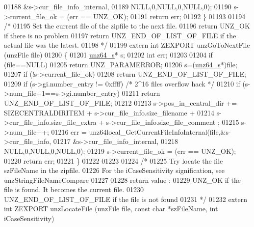 \begin{DoxyCode}
01188                                              &s->cur\_file\_info\_internal,
01189                                              NULL,0,NULL,0,NULL,0);
01190     s->current\_file\_ok = (err == UNZ\_OK);
01191     \textcolor{keywordflow}{return} err;
01192 \}
01193 
01194 \textcolor{comment}{/*}
01195 \textcolor{comment}{  Set the current file of the zipfile to the next file.}
01196 \textcolor{comment}{  return UNZ\_OK if there is no problem}
01197 \textcolor{comment}{  return UNZ\_END\_OF\_LIST\_OF\_FILE if the actual file was the latest.}
01198 \textcolor{comment}{*/}
01199 \textcolor{keyword}{extern} \textcolor{keywordtype}{int} ZEXPORT unzGoToNextFile (unzFile  file)
01200 \{
01201     \hyperlink{structunz64__s}{unz64\_s}* s;
01202     \textcolor{keywordtype}{int} err;
01203 
01204     \textcolor{keywordflow}{if} (file==NULL)
01205         \textcolor{keywordflow}{return} UNZ\_PARAMERROR;
01206     s=(\hyperlink{structunz64__s}{unz64\_s}*)file;
01207     \textcolor{keywordflow}{if} (!s->current\_file\_ok)
01208         \textcolor{keywordflow}{return} UNZ\_END\_OF\_LIST\_OF\_FILE;
01209     \textcolor{keywordflow}{if} (s->gi.number\_entry != 0xffff)    \textcolor{comment}{/* 2^16 files overflow hack */}
01210       \textcolor{keywordflow}{if} (s->num\_file+1==s->gi.number\_entry)
01211         \textcolor{keywordflow}{return} UNZ\_END\_OF\_LIST\_OF\_FILE;
01212 
01213     s->pos\_in\_central\_dir += SIZECENTRALDIRITEM + s->cur\_file\_info.size\_filename +
01214             s->cur\_file\_info.size\_file\_extra + s->cur\_file\_info.size\_file\_comment ;
01215     s->num\_file++;
01216     err = unz64local\_GetCurrentFileInfoInternal(file,&s->cur\_file\_info,
01217                                                &s->cur\_file\_info\_internal,
01218                                                NULL,0,NULL,0,NULL,0);
01219     s->current\_file\_ok = (err == UNZ\_OK);
01220     \textcolor{keywordflow}{return} err;
01221 \}
01222 
01223 
01224 \textcolor{comment}{/*}
01225 \textcolor{comment}{  Try locate the file szFileName in the zipfile.}
01226 \textcolor{comment}{  For the iCaseSensitivity signification, see unzStringFileNameCompare}
01227 \textcolor{comment}{}
01228 \textcolor{comment}{  return value :}
01229 \textcolor{comment}{  UNZ\_OK if the file is found. It becomes the current file.}
01230 \textcolor{comment}{  UNZ\_END\_OF\_LIST\_OF\_FILE if the file is not found}
01231 \textcolor{comment}{*/}
01232 \textcolor{keyword}{extern} \textcolor{keywordtype}{int} ZEXPORT unzLocateFile (unzFile file, \textcolor{keyword}{const} \textcolor{keywordtype}{char} *szFileName, \textcolor{keywordtype}{int} iCaseSensitivity)

\end{DoxyCode}
